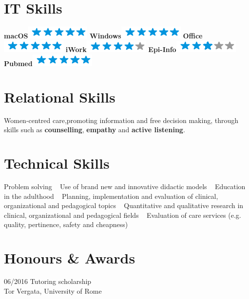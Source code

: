 \documentclass[]{friggeri-cv}
\begin{document}
\begin{aside}
~
~
~
	\section{IT Skills}
	\textbf{macOS}\includegraphics[scale=0.40]{img/5stars.png}
	\textbf{Windows}\includegraphics[scale=0.40]{img/5stars.png}
	\textbf{Office}\includegraphics[scale=0.40]{img/5stars.png}
	\textbf{iWork}\includegraphics[scale=0.40]{img/4stars.png}
	\textbf{Epi-Info}\includegraphics[scale=0.40]{img/3stars.png}
	\textbf{Pubmed}\includegraphics[scale=0.40]{img/5stars.png}
	~
	\section{Relational Skills}
	Women-centred care,promoting information and free decision making, through skills such as \textbf{counselling}, \textbf{empathy} and \textbf{active listening}.
	~
	\section{Technical Skills}
	Problem solving
	~
	Use of brand new and innovative didactic models
	~
	Education in the adulthood
	~
	Planning, implementation and evaluation of clinical, organizational and pedagogical topics
	~
	Quantitative and qualitative research in clinical, organizational and pedagogical fields
	~
	Evaluation of care services (e.g. quality, pertinence, safety and cheapness)
\end{aside}


\section{Honours \& Awards}
\begin{entrylist}
	\entry
	{06/2016}
	{Tutoring scholarship}
	{\\Tor Vergata, University of Rome}
	{}
	{}
\end{entrylist}
\end{document}
